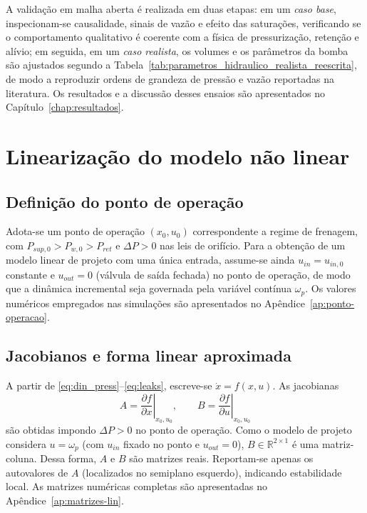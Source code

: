 A validação em malha aberta é realizada em duas etapas: em um \emph{caso base}, inspecionam-se causalidade, sinais de vazão e efeito das saturações, verificando se o comportamento qualitativo é coerente com a física de pressurização, retenção e alívio; em seguida, em um \emph{caso realista}, os volumes e os parâmetros da bomba são ajustados segundo a Tabela~\ref{tab:parametros_hidraulico_realista_reescrita}, de modo a reproduzir ordens de grandeza de pressão e vazão reportadas na literatura. Os resultados e a discussão desses ensaios são apresentados no Capítulo~\ref{chap:resultados}.



















\section{Linearização do modelo não linear}
\label{sec:controle-linearizacao-2p}



\subsection{Definição do ponto de operação}
\label{sec:definicao-ponto-operacao}
Adota-se um ponto de operação $(x_0,u_0)$ correspondente a regime de frenagem, com $P_{sup,0}>P_{w,0}>P_{ret}$ e $\Delta P>0$ nas leis de orifício. Para a obtenção de um modelo linear de projeto com uma única entrada, assume-se ainda $u_{in}=u_{in,0}$ constante e $u_{out}=0$ (válvula de saída fechada) no ponto de operação, de modo que a dinâmica incremental seja governada pela variável contínua $\omega_p$. Os valores numéricos empregados nas simulações são apresentados no Apêndice~\ref{ap:ponto-operacao}.
\subsection{Jacobianos e forma linear aproximada}
\label{sec:derivacao-matrizes-jacobianas}
A partir de \eqref{eq:din_press}–\eqref{eq:leaks}, escreve-se $\dot{x}=f(x,u)$. As jacobianas
\[
    A=\left.\frac{\partial f}{\partial x}\right|_{x_0,u_0},
    \qquad
    B=\left.\frac{\partial f}{\partial u}\right|_{x_0,u_0}
\]
são obtidas impondo $\Delta P>0$ no ponto de operação. Como o modelo de projeto considera $u=\omega_p$ (com $u_{in}$ fixado no ponto e $u_{out}=0$), $B\in\mathbb{R}^{2\times 1}$ é uma matriz-coluna. Dessa forma, $A$ e $B$ são matrizes reais. Reportam-se apenas os autovalores de $A$ (localizados no semiplano esquerdo), indicando estabilidade local. As matrizes numéricas completas são apresentadas no Apêndice~\ref{ap:matrizes-lin}.
